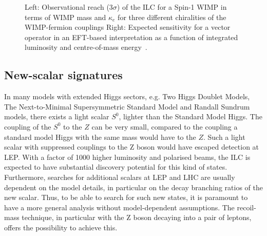 \begin{figure}[]
\setlength{\unitlength}{1.0cm}
\hspace{0.05cm}
\caption{\label{fig:searches_WIMPs} Left: Observational reach ($3\sigma$) of the ILC for a Spin-1 
  WIMP in terms of WIMP
  mass and $\kappa_e$ for three different chiralities of the WIMP-fermion couplings
   Right: Expected sensitivity for a vector operator in an EFT-based interpretation as a function of integrated
  luminosity and centre-of-mass energy~\cite{Habermehl:417605}.}
\end{figure}

\subsection{New-scalar signatures}
\label{subsec:searches_newscalars}

In many models with extended Higgs sectors, e.g.
Two Higgs Doublet Models, The Next-to-Minimal Supersymmetric  Standard  Model
and  Randall  Sundrum  models,  there  exists  a  light  scalar
$S^0$,
lighter than the Standard Model Higgs.
The coupling of the $S^0$ to the $Z$ can be very small,
compared to the coupling a standard model Higgs with the
same mass would have
to the $Z$.
Such a light scalar with suppressed couplings to the Z boson would
have escaped detection at LEP.
With a factor of 1000 higher luminosity and polarised beams,
the ILC is expected to have substantial discovery potential for
this kind of states.
Furthermore,
searches for additional scalars at LEP and LHC are usually dependent on the
model details,
in particular on the decay branching ratios of the new scalar.
Thus, to be able to search for such new states,
it is paramount to have a more general analysis without
model-dependent assumptions.
The recoil-mass technique,
in particular with the Z boson decaying into a pair of leptons,
offers the possibility to achieve this.

